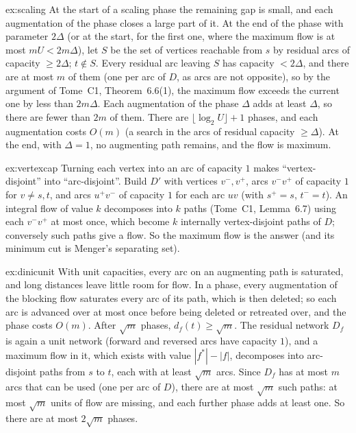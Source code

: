 \begin{solution}{ex:scaling}
\idea At the start of a scaling phase the remaining gap is small, and each augmentation of the phase closes a large part of it.
\writeup At the end of the phase with parameter $2\Delta$ (or at the start, for the first one, where the maximum flow is at most $mU<2m\Delta$), let $S$ be the set of vertices reachable from $s$ by residual arcs of capacity $\ge2\Delta$; $t\notin S$. Every residual arc leaving $S$ has capacity $<2\Delta$, and
there are at most $m$ of them (one per arc of $D$, as arcs are not opposite), so by the argument of Tome~C1, Theorem~6.6(1), the maximum flow exceeds the current one by less than $2m\Delta$. Each augmentation of the phase $\Delta$ adds at least $\Delta$, so there are fewer than $2m$ of them.
There are $\lfloor\log_2U\rfloor+1$ phases, and each augmentation costs $O(m)$ (a search in the arcs of residual capacity $\ge\Delta$). At the end, with $\Delta=1$, no augmenting path remains, and the flow is maximum.
\end{solution}

\begin{solution}{ex:vertexcap}
\idea Turning each vertex into an arc of capacity $1$ makes ``vertex-disjoint'' into ``arc-disjoint''.
\writeup Build $D'$ with vertices $v^-,v^+$, arcs $v^-v^+$ of capacity $1$ for $v\ne s,t$, and arcs $u^+v^-$ of capacity $1$ for each arc $uv$ (with $s^+=s$, $t^-=t$). An integral flow of value $k$ decomposes into $k$ paths (Tome~C1, Lemma~6.7) using each $v^-v^+$ at most once, which become $k$ internally vertex-disjoint
paths of $D$; conversely such paths give a flow. So the maximum flow is the answer (and its minimum cut is Menger's separating set).
\end{solution}

\begin{solution}{ex:dinicunit}
\idea With unit capacities, every arc on an augmenting path is saturated, and long distances leave little room for flow.
\writeup In a phase, every augmentation of the blocking flow saturates every arc of its path, which is then deleted; so each arc is advanced over at most once before being deleted or retreated over, and the phase costs $O(m)$. After $\sqrt m$ phases,
$d_f(t)\ge\sqrt m$. The residual network $D_f$ is again a unit network (forward and reversed arcs have capacity $1$), and a maximum flow in it, which exists with value $|f^*|-|f|$, decomposes into arc-disjoint paths from $s$ to $t$, each with at least $\sqrt m$ arcs. Since $D_f$ has at most $m$ arcs that can be used
(one per arc of $D$), there are at most $\sqrt m$ such paths: at most $\sqrt m$ units of flow are missing, and each further phase adds at least one. So there are at most $2\sqrt m$ phases.
\end{solution}

